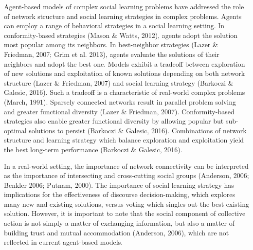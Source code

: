 Agent-based models of complex social learning problems have addressed the role of network structure and social learning strategies in complex problems. Agents can employ a range of behavioral strategies in a social learning setting. In conformity-based strategies (Mason \& Watts, 2012), agents adopt the solution most popular among its neighbors. In best-neighbor strategies (Lazer \& Friedman, 2007; Grim et al. 2013), agents evaluate the solutions of their neighbors and adopt the best one. Models exhibit a tradeoff between exploration of new solutions and exploitation of known solutions depending on both network structure (Lazer \& Friedman, 2007) and social learning strategy (Barkoczi \& Galesic, 2016). Such a tradeoff is a characteristic of real-world complex problems (March, 1991). Sparsely connected networks result in parallel problem solving and greater functional diversity (Lazer \& Friedman, 2007). Conformity-based strategies also enable greater functional diversity by allowing popular but sub-optimal solutions to persist (Barkoczi \& Galesic, 2016). Combinations of network structure and learning strategy which balance exploration and exploitation yield the best long-term performance (Barkoczi \& Galesic, 2016).

In a real-world setting, the importance of network connectivity can be interpreted as the importance of intersecting and cross-cutting social groups (Anderson, 2006; Benkler 2006; Putnam, 2000). The importance of social learning strategy has implications for the effectiveness of discourse decision-making, which explores many new and existing solutions, versus voting which singles out the best existing solution. However, it is important to note that the social component of collective action is not simply a matter of exchanging information, but also a matter of building trust and mutual accommodation (Anderson, 2006), which are not reflected in current agent-based models.



